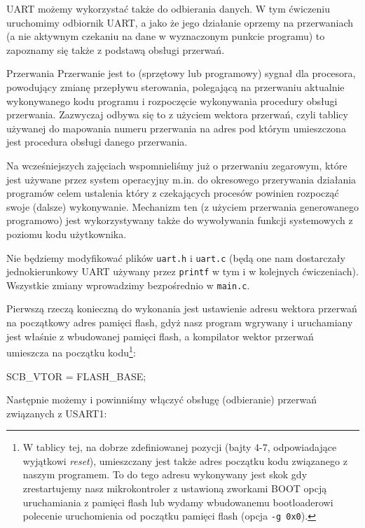 \documentclass{pdfBooklets}
\begin{document}
UART możemy wykorzystać także do odbierania danych. W tym ćwiczeniu uruchomimy odbiornik UART, a jako że jego działanie oprzemy na przerwaniach (a nie aktywnym czekaniu na dane w wyznaczonym punkcie programu) to zapoznamy się także z podstawą obsługi przerwań.

\begin{ProTip}{Przerwania}
  Przerwanie jest to (sprzętowy lub programowy) sygnał dla procesora, powodujący zmianę przepływu sterowania, polegającą na przerwaniu aktualnie wykonywanego kodu programu i rozpoczęcie wykonywania procedury obsługi przerwania.
  Zazwyczaj odbywa się to z użyciem wektora przerwań, czyli tablicy używanej do mapowania numeru przerwania na adres pod którym umieszczona jest procedura obsługi danego przerwania.
  
  Na wcześniejszych zajęciach wspomnieliśmy już o przerwaniu zegarowym, które jest używane przez system operacyjny m.in. do okresowego przerywania działania programów celem ustalenia który z czekających procesów powinien rozpocząć swoje (dalsze) wykonywanie.
  Mechanizm ten (z użyciem przerwania generowanego programowo) jest wykorzystywany także do wywoływania funkcji systemowych z poziomu kodu użytkownika.
\end{ProTip}

Nie będziemy modyfikować plików \Verb$uart.h$ i \Verb$uart.c$ (będą one nam dostarczały jednokierunkowy UART używany przez \Verb$printf$ w tym i w kolejnych ćwiczeniach). Wszystkie zmiany wprowadzimy bezpośrednio w \Verb$main.c$.

Pierwszą rzeczą konieczną do wykonania jest ustawienie adresu wektora przerwań na początkowy adres pamięci flash,
	gdyż nasz program wgrywany i uruchamiany jest właśnie z wbudowanej pamięci flash,
	a kompilator wektor przerwań umieszcza na początku kodu\footnote{
		W tablicy tej, na dobrze zdefiniowanej pozycji (bajty 4-7, odpowiadające wyjątkowi \textit{reset}), umieszczany jest także adres początku kodu związanego z naszym programem.
		To do tego adresu wykonywany jest skok gdy zrestartujemy nasz mikrokontroler z ustawioną zworkami BOOT opcją uruchamiania z pamięci flash
			lub wydamy wbudowanemu bootloaderowi polecenie uruchomienia od początku pamięci flash (opcja \Verb$-g 0x0$).
	}:
	
\begin{CodeFrame*}[c]{}
  SCB_VTOR = FLASH_BASE;
\end{CodeFrame*}

Następnie możemy i powinniśmy włączyć obsługę (odbieranie) przerwań związanych z USART1:
\end{document}
